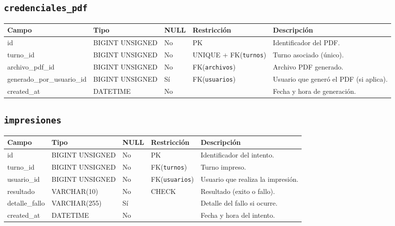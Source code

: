 \documentclass[12pt,a4paper]{article}
\begin{document}
\subsection{\texttt{credenciales\_pdf}}
\begin{longtable}{L{3.2cm} L{3.2cm} C{1.2cm} L{2.8cm} L{5.0cm}}
\toprule
\textbf{Campo} & \textbf{Tipo} & \textbf{NULL} & \textbf{Restricción} & \textbf{Descripción} \\
\midrule
\endhead
id & BIGINT UNSIGNED & No & PK & Identificador del PDF. \\
turno\_id & BIGINT UNSIGNED & No & UNIQUE + FK(\texttt{turnos}) & Turno asociado (único). \\
archivo\_pdf\_id & BIGINT UNSIGNED & No & FK(\texttt{archivos}) & Archivo PDF generado. \\
generado\_por\_usuario\_id & BIGINT UNSIGNED & Sí & FK(\texttt{usuarios}) & Usuario que generó el PDF (si aplica). \\
created\_at & DATETIME & No &  & Fecha y hora de generación. \\
\bottomrule
\end{longtable}

\subsection{\texttt{impresiones}}
\begin{longtable}{L{3.2cm} L{3.2cm} C{1.2cm} L{2.8cm} L{5.0cm}}
\toprule
\textbf{Campo} & \textbf{Tipo} & \textbf{NULL} & \textbf{Restricción} & \textbf{Descripción} \\
\midrule
\endhead
id & BIGINT UNSIGNED & No & PK & Identificador del intento. \\
turno\_id & BIGINT UNSIGNED & No & FK(\texttt{turnos}) & Turno impreso. \\
usuario\_id & BIGINT UNSIGNED & No & FK(\texttt{usuarios}) & Usuario que realiza la impresión. \\
resultado & VARCHAR(10) & No & CHECK & Resultado (exito o fallo). \\
detalle\_fallo & VARCHAR(255) & Sí &  & Detalle del fallo si ocurre. \\
created\_at & DATETIME & No &  & Fecha y hora del intento. \\
\bottomrule
\end{longtable}

\end{document}
